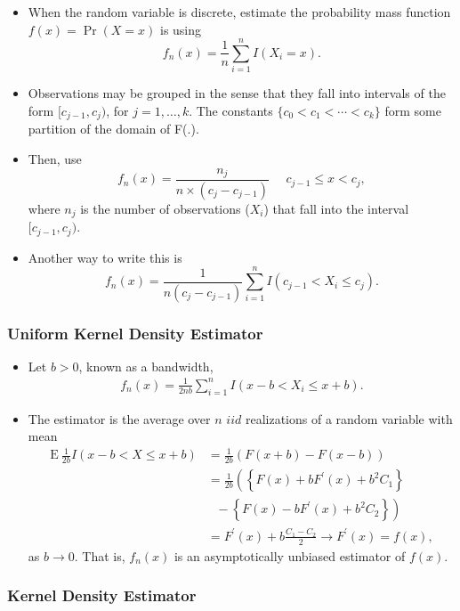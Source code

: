 \documentclass[]{book}
\begin{document}
\begin{itemize}
\item
  When the random variable is discrete, estimate the probability mass
  function \(f(x) = \Pr(X=x)\) is using
  \[f_n(x) = \frac{1}{n} \sum_{i=1}^n I(X_i = x).\]
\item
  Observations may be grouped in the sense that they fall into intervals
  of the form \([c_{j-1}, c_j)\), for \(j=1, \ldots, k\). The constants
  \(\{c_0 < c_1 < \cdots < c_k\}\) form some partition of the domain of
  F(.).
\item
  Then, use
  \[f_n(x) = \frac{n_j}{n \times (c_j - c_{j-1})}  \ \ \ \ \ \ c_{j-1} \le x < c_j,\]
  where \(n_j\) is the number of observations (\(X_i\)) that fall into
  the interval \([c_{j-1}, c_j)\).
\item
  Another way to write this is
  \[f_n(x) = \frac{1}{n(c_j-c_{j-1})} \sum_{i=1}^n I(c_{j-1} < X_i \le c_j).\]
\end{itemize}

\subsubsection{Uniform Kernel Density
Estimator}\label{uniform-kernel-density-estimator}

\begin{itemize}
\item
  Let \(b>0\), known as a bandwidth, \[\begin{aligned}
  \label{E:KDF}
   f_n(x) = \frac{1}{2nb} \sum_{i=1}^n I(x-b < X_i \le x + b).\end{aligned}\]
\item
  The estimator is the average over \(n\) \(iid\) realizations of a
  random variable with mean \[\begin{aligned}
  \mathrm{E~ } \frac{1}{2b} I(x-b < X \le x + b) &= \frac{1}{2b}\left(F(x+b)-F(x-b)\right) \\
  &= \frac{1}{2b} \left( \left\{ F(x) + b F^{\prime}(x) + b^2 C_1\right\} \right.\\
  & ~ ~ ~ -
  \left. \left\{ F(x) - b F^{\prime}(x) + b^2 C_2\right\} \right) \\
  &= F^{\prime}(x) + b \frac{C_1-C_2}{2} \rightarrow  F^{\prime}(x) = f(x),\end{aligned}\]
  as \(b\rightarrow 0\). That is, \(f_n(x)\) is an asymptotically
  unbiased estimator of \(f(x)\).
\end{itemize}

\subsubsection{Kernel Density Estimator}\label{kernel-density-estimator}
\end{document}
